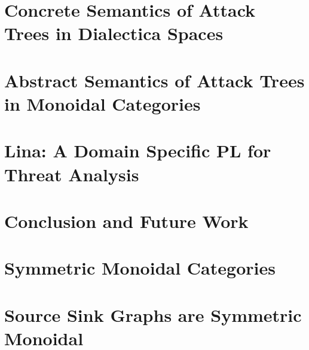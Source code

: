 \documentclass{llncs}
\begin{document}
\section{Concrete Semantics of Attack Trees in Dialectica Spaces}
\label{sec:concrete_semantics_of_attack_trees_in_dialectica_spaces}


\section{Abstract Semantics of Attack Trees in Monoidal Categories}
\label{sec:abstract_semantics_of_attack_trees_in_monoidal_categories}


\section{Lina: A Domain Specific PL for Threat Analysis}
\label{sec:lina:_a_domain_specific_pl_for_threat_analysis}


\section{Conclusion and Future Work}
\label{sec:conclusion_and_future_work}






\appendix

\section{Symmetric Monoidal Categories}
\label{sec:symmetric_monoidal_categories}



\section{Source Sink Graphs are Symmetric Monoidal}
\label{sec:source_sink_graphs_are_symmetric_monoidal}

\end{document}
